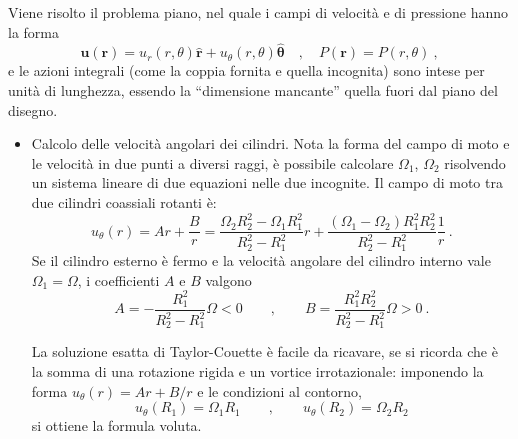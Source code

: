 \parttwo Viene risolto il problema piano, nel quale i campi di velocità e di pressione hanno la forma 
\begin{equation}
 \bm{u}(\bm{r}) = u_r(r,\theta) \bm{\hat{r}} + u_{\theta}(r,\theta) \bm{\hat{\theta}} \quad , \quad P(\bm{r}) = P(r,\theta) \ ,
\end{equation}
e le azioni integrali (come la coppia fornita e quella incognita) sono intese per unità di lunghezza, essendo la ``dimensione mancante'' quella fuori dal piano del disegno.

\begin{itemize}

\item Calcolo delle velocità angolari dei cilindri. Nota la forma del campo di moto e
le velocità in due punti a diversi raggi, è possibile calcolare $\Omega_1$, $\Omega_2$
 risolvendo un sistema lineare di due equazioni nelle due incognite.
%
Il campo di moto tra due cilindri coassiali rotanti è:
\begin{equation}
  u_\theta(r) = A r + \dfrac{B}{r} = \frac{\Omega_2 R_2^2 - \Omega_1 R_1^2}{R_2^2-R_1^2} r +
   \frac{(\Omega_1 - \Omega_2)R_1^2 R_2^2}{R_2^2-R_1^2}\frac{1}{r} \ .
\end{equation}
Se il cilindro esterno è fermo e la velocità angolare del cilindro interno vale $\Omega_1 = \Omega$, i coefficienti $A$ e $B$ valgono
\begin{equation}
 A = - \frac{R_1^2}{R_2^2-R_1^2} \Omega  < 0 \qquad , \qquad B = \frac{R_1^2 R_2^2}{R_2^2-R_1^2} \Omega > 0 \ .	
\end{equation}
%
\begin{remark} La soluzione esatta di Taylor-Couette è facile da ricavare, se si ricorda
che è la somma di una rotazione rigida e un vortice irrotazionale: imponendo la forma
$u_\theta (r) = A r + B/r$ e le condizioni al contorno,
\begin{equation}
 u_{\theta}(R_1) = \Omega_1 R_1 \qquad , \qquad  u_{\theta}(R_2) = \Omega_2 R_2
\end{equation}
si ottiene la formula voluta.
\end{remark}


\end{itemize}
